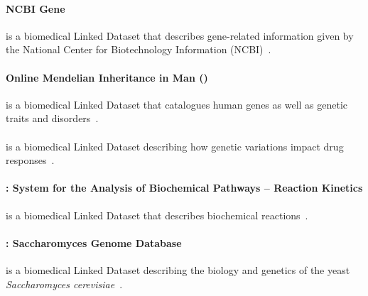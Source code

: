 \paragraph{NCBI Gene} is a biomedical Linked Dataset that describes gene-related information given by the National Center for Biotechnology Information (NCBI)~\cite{DumontierCCAEBD14}.


\paragraph{Online Mendelian Inheritance in Man (\omim)} is a biomedical Linked Dataset that catalogues human genes as well as genetic traits and disorders~\cite{DumontierCCAEBD14}. %


\paragraph{\pharmgkb} is a biomedical Linked Dataset describing how genetic variations impact drug responses~\cite{DumontierCCAEBD14}. %

\paragraph{\sabiork: System for the Analysis of Biochemical Pathways -- Reaction Kinetics} is a biomedical Linked Dataset that describes biochemical reactions~\cite{DumontierCCAEBD14}. %

\paragraph{\sgd: Saccharomyces Genome Database} is a biomedical Linked Dataset describing the biology and genetics of the yeast \textit{Saccharomyces cerevisiae}~\cite{DumontierCCAEBD14}. %

